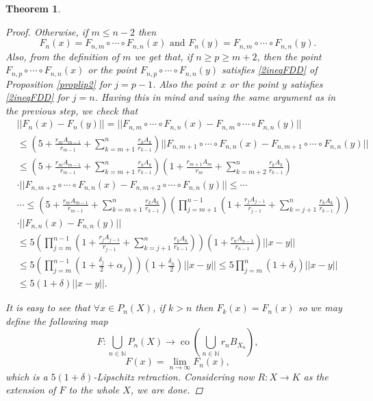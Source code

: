 \documentclass[11pt]{amsart}
\newcommand{\N}{\mathbb{N}}
\DeclareMathOperator{\co}{co}
\newcommand{\<}{\langle}
\renewcommand{\>}{\rangle}
\newtheorem{theorem}{Theorem}[section]
\theoremstyle{definition}
\theoremstyle{remark}
\numberwithin{equation}{section}
\begin{document}
\begin{theorem}
\begin{proof}
Otherwise, if $m\le n-2$ then
$$F_n(x)=F_{n,m}\circ\cdots\circ F_{n,n}(x)\text{ and }F_n(y)=F_{n,m}\circ\cdots\circ F_{n,n}(y).$$
Also, from the definition of $m$ we get that, if $n\ge p\ge m+2$, then the point $F_{n,p}\circ\cdots\circ F_{n,n}(x)$ or the point $F_{n,p}\circ\cdots\circ F_{n,n}(y)$ satisfies \eqref{2ineqFDD} of Proposition \ref{proplip2} for $j= p-1$. Also the point $x$ or the point $y$ satisfies \eqref{2ineqFDD} for $j=n$. Having this in mind and using the same argument as in the previous step, we check that
$$\begin{aligned} &||F_n(x)-F_n(y)||=||F_{n,m}\circ\cdots\circ F_{n,n}(x)-F_{n,m}\circ\cdots\circ F_{n,n}(y)||\\
&\le\left( 5+\frac{r_mA_{m-1}}{r_{m-1}}+\sum\limits_{k=m+1}^{n}\frac{r_kA_k}{r_{k-1}} \right)||F_{n,m+1}\circ\cdots\circ F_{n,n}(x)-F_{n,m+1}\circ\cdots\circ F_{n,n}(y)||\\
&\le\left(5+\frac{r_mA_{m-1}}{r_{m-1}}+\sum\limits_{k=m+1}^{n}\frac{r_kA_k}{r_{k-1}}\right)\left( 1+ \frac{r_{m+1}A_m}{r_m} +\sum\limits_{k=m+2}^n\frac{r_kA_k}{r_{k-1}} \right)\\
&\cdot||F_{n,m+2}\circ\cdots\circ F_{n,n}(x)-F_{n,m+2}\circ\cdots\circ F_{n,n}(y)||\le\cdots\\
&\cdots\le \left(5+\frac{r_mA_{m-1}}{r_{m-1}}+\sum\limits_{k=m+1}^{n}\frac{r_kA_k}{r_{k-1}}\right)\left(\prod\limits_{j=m+1}^{n-1}\left( 1+ \frac{r_{j}A_{j-1}}{r_{j-1}} +\sum\limits_{k=j+1}^n\frac{r_kA_k}{r_{k-1}} \right)\right)\\
&\cdot||F_{n,n}(x)-F_{n,n}(y)||\\
&\le 5\left(\prod\limits_{j=m}^{n-1}\left( 1+ \frac{r_{j}A_{j-1}}{r_{j-1}} +\sum\limits_{k=j+1}^n\frac{r_kA_k}{r_{k-1}} \right)\right)\left(1+\frac{r_nA_{n-1}}{r_{n-1}}\right)||x-y||\\
&\le5\left(\prod\limits_{j=m}^{n-1}\left( 1+\frac{\delta_j}{2}+\alpha_j \right)\right)\left( 1+\frac{\delta_n}{2} \right)||x-y||\le 5\prod\limits_{j=m}^n(1+\delta_j)||x-y||\\
&\le5(1+\delta)||x-y||.
\end{aligned}$$

It is easy to see that $\forall x\in P_n(X)$, if $k>n$ then $F_k(x)=F_n(x)$ so we may define the following map
$$F:\bigcup\limits_{n\in\N}P_n(X)\rightarrow\co\left(\bigcup\limits_{n\in\N}r_nB_{X_n}\right),$$
$$F(x)=\lim\limits_{n\to\infty}F_n(x),$$
which is a $5(1+\delta)$-Lipschitz retraction. Considering now $R:X\rightarrow K$ as the extension of $F$ to the whole $X$, we are done.
\end{proof}
\end{theorem}
\end{document}
